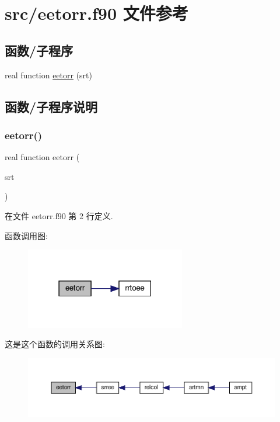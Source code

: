 \hypertarget{eetorr_8f90}{}\section{src/eetorr.f90 文件参考}
\label{eetorr_8f90}
\subsection*{函数/子程序}
\begin{DoxyCompactItemize}
\item 
real function \mbox{\hyperlink{eetorr_8f90_adb9c8d6b98e51c1be64977f2538a62eb}{eetorr}} (srt)
\end{DoxyCompactItemize}


\subsection{函数/子程序说明}
\mbox{\label{eetorr_8f90_adb9c8d6b98e51c1be64977f2538a62eb}} 
\subsubsection{\texorpdfstring{eetorr()}{eetorr()}}
{\footnotesize\ttfamily real function eetorr (\begin{DoxyParamCaption}\item[{}]{srt }\end{DoxyParamCaption})}



在文件 eetorr.\+f90 第 2 行定义.

函数调用图\+:
\nopagebreak
\begin{figure}[H]
\begin{center}
\leavevmode
\includegraphics[width=198pt]{eetorr_8f90_adb9c8d6b98e51c1be64977f2538a62eb_cgraph}
\end{center}
\end{figure}
这是这个函数的调用关系图\+:
\nopagebreak
\begin{figure}[H]
\begin{center}
\leavevmode
\includegraphics[width=350pt]{eetorr_8f90_adb9c8d6b98e51c1be64977f2538a62eb_icgraph}
\end{center}
\end{figure}

